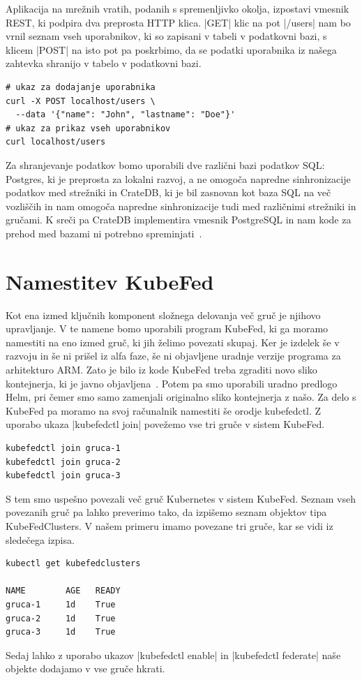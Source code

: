 \documentclass[a4paper, 12pt]{book}
\begin{document}
Aplikacija na mrežnih vratih, podanih s spremenljivko okolja, izpostavi vmesnik REST, ki podpira dva preprosta HTTP klica.
\spverb|GET| klic na pot \spverb|/users| nam bo vrnil seznam vseh uporabnikov, ki so zapisani v tabeli v podatkovni bazi, s klicem \spverb|POST| na isto pot pa poskrbimo, da se podatki uporabnika iz našega zahtevka shranijo v tabelo v podatkovni bazi.
\begin{verbatim}
# ukaz za dodajanje uporabnika
curl -X POST localhost/users \
  --data '{"name": "John", "lastname": "Doe"}'
# ukaz za prikaz vseh uporabnikov
curl localhost/users
\end{verbatim}

Za shranjevanje podatkov bomo uporabili dve različni bazi podatkov SQL: Postgres, ki je preprosta za lokalni razvoj, a ne omogoča napredne sinhronizacije podatkov med strežniki in CrateDB, ki je bil zasnovan kot baza SQL na več vozliščih in nam omogoča napredne sinhronizacije tudi med različnimi strežniki in gručami.
K sreči pa CrateDB implementira vmesnik PostgreSQL in nam kode za prehod med bazami ni potrebno spreminjati~\cite{cratedb}.
\section{Namestitev KubeFed}
Kot ena izmed ključnih komponent složnega delovanja več gruč je njihovo upravljanje.
V te namene bomo uporabili program KubeFed, ki ga moramo namestiti na eno izmed gruč, ki jih želimo povezati skupaj.
Ker je izdelek še v razvoju in še ni prišel iz alfa faze, še ni objavljene uradnje verzije programa za arhitekturo ARM.
Zato je bilo iz kode KubeFed treba zgraditi novo sliko kontejnerja, ki je javno objavljena~\cite{docker-kubefed}.
Potem pa smo uporabili uradno predlogo Helm, pri čemer smo samo zamenjali originalno sliko kontejnerja z našo.
Za delo s KubeFed pa moramo na svoj računalnik namestiti še orodje kubefedctl.
Z uporabo ukaza \spverb|kubefedctl join| povežemo vse tri gruče v sistem KubeFed.
\begin{verbatim}
kubefedctl join gruca-1
kubefedctl join gruca-2
kubefedctl join gruca-3
\end{verbatim}
S tem smo uspešno povezali več gruč Kubernetes v sistem KubeFed.
Seznam vseh povezanih gruč pa lahko preverimo tako, da izpišemo seznam objektov tipa KubeFedClusters. 
V našem primeru imamo povezane tri gruče, kar se vidi iz sledečega izpisa.
\begin{verbatim}
kubectl get kubefedclusters

NAME        AGE   READY
gruca-1     1d    True
gruca-2     1d    True
gruca-3     1d    True
\end{verbatim}
Sedaj lahko z uporabo ukazov \spverb|kubefedctl enable| in \spverb|kubefedctl federate| naše objekte dodajamo v vse gruče hkrati.
\end{document}
